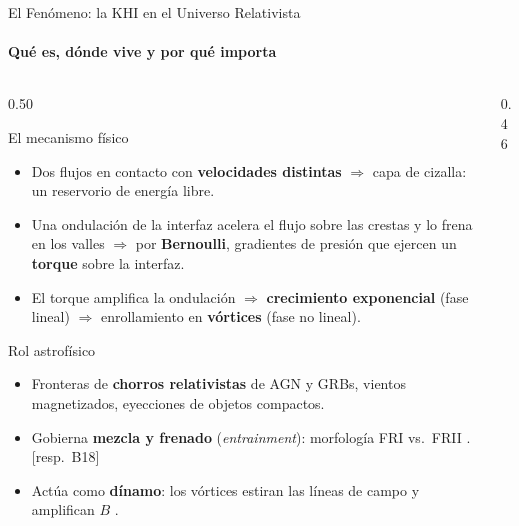 \documentclass[aspectratio=169,9pt]{beamer}
\begin{document}
\begin{frame}{El Fen\'omeno: la KHI en el Universo Relativista}
\framesubtitle{Qu\'e es, d\'onde vive y por qu\'e importa}
\begin{columns}[T]
\begin{column}{0.50\textwidth}
  \begin{block}{El mecanismo f\'isico}
    \scriptsize
    \begin{itemize}\setlength\itemsep{2pt}
      \item Dos flujos en contacto con \textbf{velocidades distintas}
            $\Rightarrow$ capa de cizalla: un reservorio de energ\'ia libre.
      \item Una ondulaci\'on de la interfaz acelera el flujo sobre las crestas
            y lo frena en los valles $\Rightarrow$ por \textbf{Bernoulli},
            gradientes de presi\'on que ejercen un \textbf{torque} sobre la interfaz.
      \item El torque amplifica la ondulaci\'on $\Rightarrow$
            \textbf{crecimiento exponencial} (fase lineal) $\Rightarrow$
            enrollamiento en \textbf{v\'ortices} (fase no lineal).
    \end{itemize}
  \end{block}
  \begin{block}{Rol astrof\'isico}
    \scriptsize
    \begin{itemize}\setlength\itemsep{2pt}
      \item Fronteras de \textbf{chorros relativistas} de AGN y GRBs,
            vientos magnetizados, eyecciones de objetos compactos.
      \item Gobierna \textbf{mezcla y frenado} (\textit{entrainment}):
            morfolog\'ia FRI vs.\ FRII \citep{osmanov-2008}.
            \hfill{\tiny[resp.\ B18]}
      \item Act\'ua como \textbf{d\'inamo}: los v\'ortices estiran las l\'ineas
            de campo y amplifican $B$ \citep{pimentel-2019}.
    \end{itemize}
  \end{block}
\end{column}
\begin{column}{0.46\textwidth}
\end{column}
\end{columns}
\end{frame}
\end{document}
